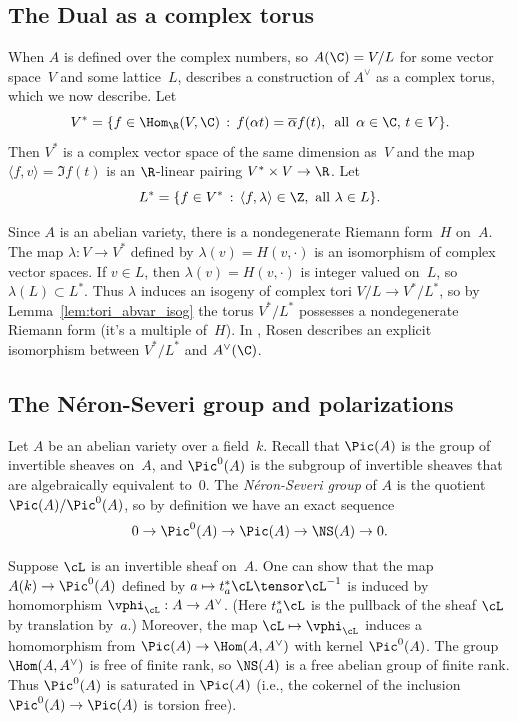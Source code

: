 \documentclass{report}
\begin{document}
\subsection{The Dual as a complex torus}
When $A$ is defined over the complex numbers, so $A(\C)=V/L$ for
some vector space~$V$ and some lattice~$L$,
\cite[\S4]{rosen:abvars} describes a construction of $A^{\vee}$ as
a complex torus, which we now describe.  Let
\[
  V^* = \{f \in \Hom_\R(V,\C) \,:\, f(\alpha t) = \overline{\alpha}
  f(t),\,\text{ all }\, \alpha\in\C,\,t\in V\}.
\]
Then $V^*$ is a complex vector space of the same dimension as~$V$
and the map $\langle f,v\rangle = \Im f(t)$ is an $\R$-linear
pairing $V^*\times V\to\R$. Let
\[
  L^*=\{f\in V^* \, : \, \langle f, \lambda\rangle \in\Z, \text{
  all }\lambda\in L\}.
\]

Since $A$ is an abelian variety, there is a nondegenerate Riemann
form~$H$ on~$A$.  The map $\lambda:V\to V^*$ defined by
$\lambda(v)=H(v,\cdot)$ is an isomorphism of complex vector
spaces. If $v\in L$, then $\lambda(v)=H(v,\cdot)$ is integer
valued on~$L$, so $\lambda(L)\subset L^*$.  Thus $\lambda$ induces
an isogeny of complex tori $V/L \to V^*/L^*$, so by
Lemma~\ref{lem:tori_abvar_isog} the torus $V^*/L^*$ possesses a
nondegenerate Riemann form (it's a multiple of~$H$).  In
\cite[\S4]{rosen:abvars}, Rosen describes an explicit isomorphism
between $V^*/L^*$ and $A^{\vee}(\C)$.

\subsection{The N\'eron-Severi group and polarizations}
Let $A$ be an abelian variety over a field~$k$.  Recall that
$\Pic(A)$ is the group of invertible sheaves on~$A$, and
$\Pic^0(A)$ is the subgroup of invertible sheaves that are
algebraically equivalent to~$0$.  The {\em N\'eron-Severi group}
of $A$ is the quotient $\Pic(A)/\Pic^0(A)$, so by definition we
have an exact sequence
\[
  0 \to \Pic^0(A) \to \Pic(A) \to \NS(A)\to 0.
\]

Suppose $\cL$ is an invertible sheaf on~$A$.  One can show that
the map $A(k)\to \Pic^0(A)$ defined by $a \mapsto t_a^*\cL \tensor
\cL^{-1}$ is induced by homomorphism $\vphi_\cL:A\to A^{\vee}$.
(Here $t_a^*\cL$ is the pullback of the sheaf $\cL$ by translation
by~$a$.) Moreover, the map $\cL\mapsto \vphi_\cL$ induces a
homomorphism from $\Pic(A)\to \Hom(A,A^{\vee})$ with kernel
$\Pic^0(A)$.   The group $\Hom(A,A^{\vee})$ is free of finite
rank, so $\NS(A)$ is a free abelian group of finite rank. Thus
$\Pic^0(A)$ is saturated in $\Pic(A)$ (i.e., the cokernel of the
inclusion $\Pic^0(A)\to \Pic(A)$ is torsion free).
\end{document}
